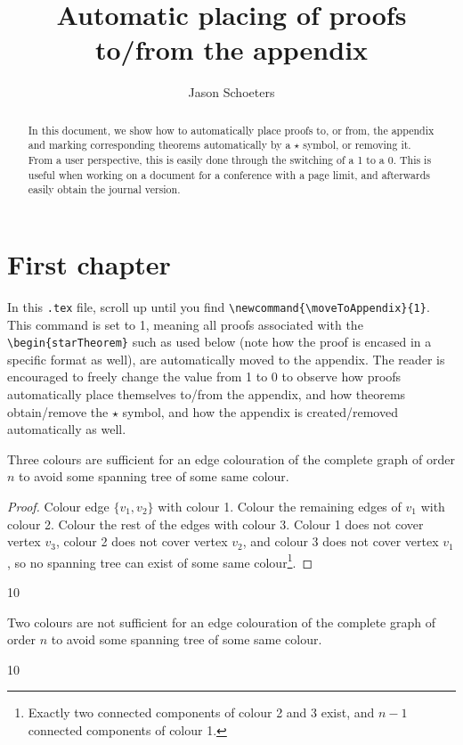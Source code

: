 \documentclass[a4paper,USenglish]{lipics-v2021}
\title{Automatic placing of proofs to/from the appendix}
\author{Jason {Schoeters}}{University of Cambridge \and \url{https://jschoete.github.io/}}{jason.schoeters.cs@gmail.com}{}{}
\newcommand{\moveToAppendix}{1}
\newcommand{\starBool}{0}
\newcommand{\starToggle}{\if\starBool0{\gdef\starBool{1}}\else{\gdef\starBool{0}}\fi}
\newenvironment{starTheorem}[1]
{\if\moveToAppendix1\starToggle\fi
	\restatable{theorem}{#1}
}
{ 
	\endrestatable
	\if\moveToAppendix1\starToggle\fi
}
\begin{document}
	
\maketitle

\begin{abstract}
	In this document, we show how to automatically place proofs to, or from, the appendix and marking corresponding theorems automatically by a $\star$ symbol, or removing it. From a user perspective, this is easily done through the switching of a 1 to a 0. This is useful when working on a document for a conference with a page limit, and afterwards easily obtain the journal version.
\end{abstract}

\section{First chapter}

In this \verb|.tex| file, scroll up until you find \verb|\newcommand{\moveToAppendix}{1}|. This command is set to 1, meaning all proofs associated with the \verb|\begin{starTheorem}| such as  used below (note how the proof is encased in a specific format as well), are automatically moved to the appendix. The reader is encouraged to freely change the value from 1 to 0 to observe how proofs automatically place themselves to/from the appendix, and how theorems obtain/remove the $\star$ symbol, and how the appendix is created/removed automatically as well. 

\begin{theorem}
	\label{theorem:one}
	Three colours are sufficient for an edge colouration of the complete graph of order $n$ to avoid some spanning tree of some same colour.
\end{theorem}

\begin{proof}
		Colour edge $\{v_1, v_2\}$ with colour 1. Colour the remaining edges of $v_1$ with colour 2. Colour the rest of the edges with colour 3.
		Colour 1 does not cover vertex $v_3$, colour 2 does not cover vertex $v_2$, and colour 3 does not cover vertex $v_1$, so no spanning tree can exist of some same colour\footnote{Exactly two connected components of colour 2 and 3 exist, and $n-1$ connected components of colour 1.}.
\end{proof}

\begin{starTheorem}{starTheoremTwo}
	\label{theorem:two}
	Two colours are not sufficient for an edge colouration of the complete graph of order $n$ to avoid some spanning tree of some same colour.
\end{starTheorem}
\end{document}

